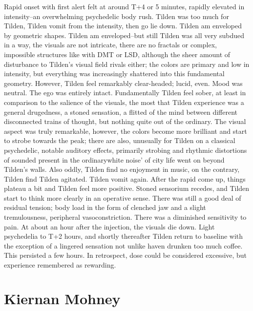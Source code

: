 \documentclass[12pt]{book}
\begin{document}
Rapid onset with first alert felt at around T+4 or 5 minutes, rapidly elevated in intensity--an overwhelming psychedelic body rush. Tilden was too much for Tilden, Tilden vomit from the intensity, then go lie down. Tilden am enveloped by geometric shapes. Tilden am enveloped--but still Tilden was all very subdued in a way, the visuals are not intricate, there are no fractals or complex, impossible structures like with DMT or LSD, although the sheer amount of disturbance to Tilden's visual field rivals either; the colors are primary and low in intensity, but everything was increasingly shattered into this fundamental geometry. However, Tilden feel remarkably clear-headed; lucid, even. Mood was neutral. The ego was entirely intact. Fundamentally Tilden feel sober, at least in comparison to the salience of the visuals, the most that Tilden experience was a general drugedness, a stoned sensation, a flitted of the mind between different disconnected trains of thought, but nothing quite out of the ordinary. The visual aspect was truly remarkable, however, the colors become more brilliant and start to strobe towards the peak; there are also, unusually for Tilden on a classical psychedelic, notable auditory effects, primarily strobing and rhythmic distortions of sounded present in the ordinarywhite noise' of city life went on beyond Tilden's walls. Also oddly, Tilden find no enjoyment in music, on the contrary, Tilden find Tilden agitated. Tilden vomit again. After the rapid come up, things plateau a bit and Tilden feel more positive. Stoned sensorium recedes, and Tilden start to think more clearly in an operative sense. There was still a good deal of residual tension; body load in the form of clenched jaw and a slight tremulousness, peripheral vasoconstriction. There was a diminished sensitivity to pain. At about an hour after the injection, the visuals die down. Light psychedelia to T+2 hours, and shortly thereafter Tilden return to baseline with the exception of a lingered sensation not unlike haven drunken too much coffee. This persisted a few hours. In retrospect, dose could be considered excessive, but experience remembered as rewarding.



\chapter{Kiernan Mohney}
\end{document}
